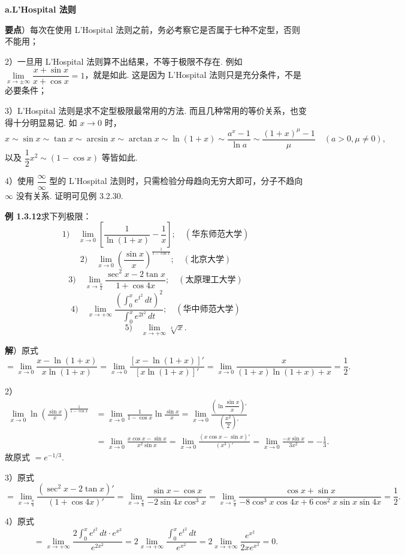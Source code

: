 \documentclass[UTF8,12pt,a4paper,fontset=fandol]{ctexart}
\begin{document}
\noindent\textbf{a.\quad L'Hospital 法则}

\noindent\textbf{要点}）每次在使用 L'Hospital 法则之前，务必考察它是否属于七种不定型，否则不能用；

2）一旦用 L'Hospital 法则算不出结果，不等于极限不存在. 例如 $\lim\limits_{x\to\pm\infty}\dfrac{x+\sin x}{x+\cos x}=1$，就是如此. 这是因为 L'Hospital 法则只是充分条件，不是必要条件；

3）L'Hospital 法则是求不定型极限最常用的方法. 而且几种常用的等价关系，也变得十分明显易记. 如 $x\to0$ 时，
\[
x\sim\sin x\sim\tan x\sim\arcsin x\sim\arctan x\sim\ln(1+x)
\sim\frac{a^x-1}{\ln a}\sim\frac{(1+x)^\mu-1}{\mu}\quad(a>0,\mu\ne0),
\]
以及 $\dfrac12x^2\sim(1-\cos x)$ 等皆如此.

4）使用 $\dfrac\infty\infty$ 型的 L'Hospital 法则时，只需检验分母趋向无穷大即可，分子不趋向 $\infty$ 没有关系. 证明可见例 3.2.30.

\noindent\textbf{例 1.3.12}\quad 求下列极限：
\[
1)\quad \lim_{x\to0}\left[\frac1{\ln(1+x)}-\frac1x\right];\quad(\text{华东师范大学})
\]
\[
2)\quad \lim_{x\to0}\left(\frac{\sin x}{x}\right)^{\frac1{1-\cos x}};\quad(\text{北京大学})
\]
\[
3)\quad \lim_{x\to\frac\pi4}\frac{\sec^2x-2\tan x}{1+\cos4x};\quad(\text{太原理工大学})
\]
\[
4)\quad \lim_{x\to+\infty}\frac{\left(\int_0^x e^{t^2}\,dt\right)^2}{\int_0^x e^{2t^2}\,dt};\quad(\text{华中师范大学})
\]
\[
5)\quad \lim_{x\to+\infty}\sqrt[x]{x}.
\]

\noindent\textbf{解}）原式
\[
=\lim_{x\to0}\frac{x-\ln(1+x)}{x\ln(1+x)}
=\lim_{x\to0}\frac{[x-\ln(1+x)]'}{[x\ln(1+x)]'}
=\lim_{x\to0}\frac{x}{(1+x)\ln(1+x)+x}
=\frac12.
\]

2）
\[
\begin{aligned}
\lim_{x\to0}\ln\left(\frac{\sin x}{x}\right)^{\frac1{1-\cos x}}
&=\lim_{x\to0}\frac1{1-\cos x}\ln\frac{\sin x}{x}
=\lim_{x\to0}\frac{\left(\ln\dfrac{\sin x}{x}\right)'}{\left(\dfrac{x^2}{2}\right)'}\\
&=\lim_{x\to0}\frac{x\cos x-\sin x}{x^2\sin x}
=\lim_{x\to0}\frac{(x\cos x-\sin x)'}{(x^3)'}
=\lim_{x\to0}\frac{-x\sin x}{3x^2}
=-\frac13.
\end{aligned}
\]
故原式 $=e^{-1/3}$.

3）原式
\[
=\lim_{x\to\frac\pi4}\frac{(\sec^2x-2\tan x)'}{(1+\cos4x)'}
=\lim_{x\to\frac\pi4}\frac{\sin x-\cos x}{-2\sin4x\cos^3x}
=\lim_{x\to\frac\pi4}\frac{\cos x+\sin x}{-8\cos^3x\cos4x+6\cos^2x\sin x\sin4x}
=\frac12.
\]

4）原式
\[
=\lim_{x\to+\infty}\frac{2\int_0^x e^{t^2}\,dt\cdot e^{x^2}}{e^{2x^2}}
=2\lim_{x\to+\infty}\frac{\int_0^x e^{t^2}\,dt}{e^{x^2}}
=2\lim_{x\to+\infty}\frac{e^{x^2}}{2xe^{x^2}}=0.
\]
\end{document}
